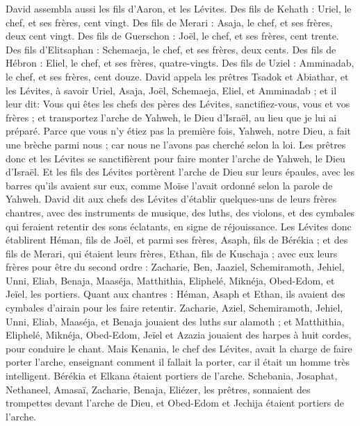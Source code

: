 \begin{multicols}{2}
David assembla aussi les fils d'Aaron, et les Lévites.
Des fils de Kehath : Uriel, le chef, et ses frères, cent vingt.
Des fils de Merari : Asaja, le chef, et ses frères, deux cent vingt.
Des fils de Guerschon : Joël, le chef, et ses frères, cent trente.
Des fils d'Elitsaphan : Schemaeja, le chef, et ses frères, deux cents.
Des fils de Hébron : Eliel, le chef, et ses frères, quatre-vingts.
Des fils de Uziel : Amminadab, le chef, et ses frères, cent douze.
David appela les prêtres Tsadok et Abiathar, et les Lévites, à savoir Uriel, Asaja, Joël, Schemaeja, Eliel, et Amminadab ;
et il leur dit: Vous qui êtes les chefs des pères des Lévites, sanctifiez-vous, vous et vos frères ; et transportez l'arche de Yahweh, le Dieu d'Israël, au lieu que je lui ai préparé.
Parce que vous n'y étiez pas la première fois, Yahweh, notre Dieu, a fait une brèche parmi nous ; car nous ne l'avons pas cherché selon la loi.
Les prêtres donc et les Lévites se sanctifièrent pour faire monter l'arche de Yahweh, le Dieu d'Israël.
Et les fils des Lévites portèrent l'arche de Dieu sur leurs épaules, avec les barres qu'ils avaient sur eux, comme Moïse l'avait ordonné selon la parole de Yahweh.
David dit aux chefs des Lévites d'établir quelques-uns de leurs frères chantres, avec des instruments de musique, des luths, des violons, et des cymbales qui feraient retentir des sons éclatants, en signe de réjouissance.
Les Lévites donc établirent Héman, fils de Joël, et parmi ses frères, Asaph, fils de Bérékia ; et des fils de Merari, qui étaient leurs frères, Ethan, fils de Kuschaja ;
avec eux leurs frères pour être du second ordre : Zacharie, Ben, Jaaziel, Schemiramoth, Jehiel, Unni, Eliab, Benaja, Maaséja, Matthithia, Eliphelé, Miknéja, Obed-Edom, et Jeïel, les portiers.
Quant aux chantres : Héman, Asaph et Ethan, ils avaient des cymbales d'airain pour les faire retentir.
Zacharie, Aziel, Schemiramoth, Jehiel, Unni, Eliab, Maaséja, et Benaja jouaient des luths sur alamoth ;
et Matthithia, Eliphelé, Miknéja, Obed-Edom, Jeïel et Azazia jouaient des harpes à huit cordes, pour conduire le chant.
Mais Kenania, le chef des Lévites, avait la charge de faire porter l'arche, enseignant comment il fallait la porter, car il était un homme très intelligent.
Bérékia et Elkana étaient portiers de l'arche.
Schebania, Josaphat, Nethaneel, Amasaï, Zacharie, Benaja, Eliézer, les prêtres, sonnaient des trompettes devant l'arche de Dieu, et Obed-Edom et Jechija étaient portiers de l'arche.

\end{multicols}
